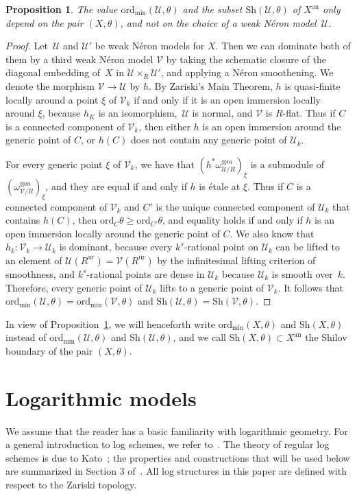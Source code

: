 \documentclass[11pt]{article}
\newtheorem{prop}[equation]{Proposition}
\theoremstyle{definition}
\numberwithin{equation}{subsection}
\newcommand{\cU}{\ensuremath{\mathscr{U}}}
\newcommand{\cV}{\ensuremath{\mathscr{V}}}
\newcommand{\an}{\mathrm{an}}
\newcommand{\ord}{\mathrm{ord}}
\newcommand{\ordmin}{\ord_{\min}}
\newcommand{\Sh}{\mathrm{Sh}}
\newcommand{\ur}{\mathrm{ur}}
\let\form\theta
\begin{document}
\begin{prop}\label{prop:indep}
The value $\ordmin(\cU,\form)$ and the subset $\Sh(\cU,\form)$ of $X^{\an}$ only depend on the pair $(X,\form)$, and not on the choice of a weak Néron model~$\cU$.
\end{prop}
\begin{proof}
Let~$\cU$ and $\cU'$ be weak Néron models for $X$. Then we can dominate both of them by a third weak Néron model $\cV$ by taking
the schematic closure of the diagonal embedding of~$X$ in $\cU\times_R \cU'$, and applying a Néron smoothening. We denote the morphism $\cV\to \cU$ by $h$.
By Zariski's Main Theorem, $h$ is quasi-finite locally around a point $\xi$ of $\cV_k$ if and only if it is an open immersion locally around $\xi$, because $h_K$ is an isomorphism,~$\cU$ is normal, and $\cV$ is $R$\nobreakdash-flat. Thus if $C$ is a connected component of $\cV_k$, then either $h$ is an open immersion around the generic point of $C$, or $h(C)$ does not contain any generic point of $\cU_k$.

For every generic point $\xi$ of $\cV_k$, we have that $(h^*\omega^{\otimes m}_{\cU/R})_{\xi}$ is a submodule of $(\omega^{\otimes m}_{\cV/R})_{\xi}$, and they are equal if and only if
$h$ is étale at $\xi$.
Thus if $C$ is a connected component of $\cV_k$ and $C'$ is the unique connected component of $\cU_k$ that contains $h(C)$, then
$\ord_{C}\form\geq \ord_{C'}\form$, and equality holds if and only if $h$ is an open immersion locally around the generic point of $C$.
We also know that $h_k:\cV_k\to \cU_k$ is dominant, because every $k^s$-rational point on $\cU_k$ can be lifted to an element of $\cU(R^{\ur})=\cV(R^{\ur})$ by the infinitesimal lifting criterion of smoothness, and $k^s$-rational points are dense in $\cU_k$ because $\cU_k$ is smooth over~$k$.
Therefore, every generic point of $\cU_k$ lifts to a generic point of $\cV_k$.
It follows that $\ordmin(\cU,\form)=\ordmin(\cV,\form)$
and $\Sh(\cU,\form)=\Sh(\cV,\form)$.
\end{proof}

In view of Proposition~\ref{prop:indep}, we will henceforth write $\ordmin(X,\form)$ and $\Sh(X,\form)$ instead of $\ordmin(\cU,\form)$ and $\Sh(\cU,\form)$, and we call
$\Sh(X,\form)\subset X^{\an}$ the Shilov boundary of the pair $(X,\form)$.

\section{Logarithmic models}\label{sec:log}
We assume that the reader has a basic familiarity with logarithmic geometry. For a general introduction to log schemes, we refer to~\cite{kato-log}. The theory of regular log schemes is due to Kato~\cite{kato}; the properties and constructions that will be used below are summarized in Section 3 of~\cite{logzeta}. All log structures in this paper are defined with respect to the Zariski topology.
\end{document}
